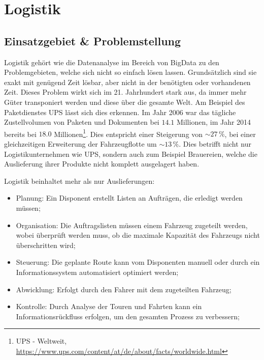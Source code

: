 \chapter{Logistik}
\label{Logistik}

\section{Einsatzgebiet \& Problemstellung}

Logistik gehört wie die Datenanalyse im Bereich von BigData zu den Problemgebieten, welche sich nicht so einfach lösen lassen. 
Grundsätzlich sind sie exakt mit genügend Zeit lösbar, aber nicht in der benötigten oder vorhandenen Zeit. 
Dieses Problem wirkt sich im 21. Jahrhundert stark aus, da immer mehr Güter transponiert werden und diese über die gesamte Welt. 
Am Beispiel des Paketdienstes UPS lässt sich dies erkennen. 
Im Jahr 2006 war das tägliche Zustellvolumen von Paketen und Dokumenten bei $14.1$ Millionen, im Jahr 2014 bereits bei $18.0$ Millionen\footnote{UPS - Weltweit, \url{https://www.ups.com/content/at/de/about/facts/worldwide.html}}. 
Dies entspricht einer Steigerung von $\sim27\,\%$, bei einer gleichzeitigen Erweiterung der Fahrzeugflotte um $\sim13\,\%$. 
Dies betrifft nicht nur Logistikunternehmen wie UPS, sondern auch zum Beispiel Brauereien, welche die Auslieferung ihrer Produkte nicht komplett ausgelagert haben. 

\noindent
Logistik beinhaltet mehr als nur Auslieferungen: 
\begin{itemize}
	\item Planung: Ein Disponent erstellt Listen an Aufträgen, die erledigt werden müssen;
	\item Organisation: Die Auftragslisten müssen einem Fahrzeug zugeteilt werden, wobei überprüft werden muss, ob die maximale Kapazität des Fahrzeugs nicht überschritten wird; 
	\item Steuerung: Die geplante Route kann vom Disponenten manuell oder durch ein Informationssystem automatisiert optimiert werden;
	\item Abwicklung: Erfolgt durch den Fahrer mit dem zugeteilten Fahrzeug; 
	\item Kontrolle: Durch Analyse der Touren und Fahrten kann ein Informationsrückfluss erfolgen, um den gesamten Prozess zu verbessern;
\end{itemize}

